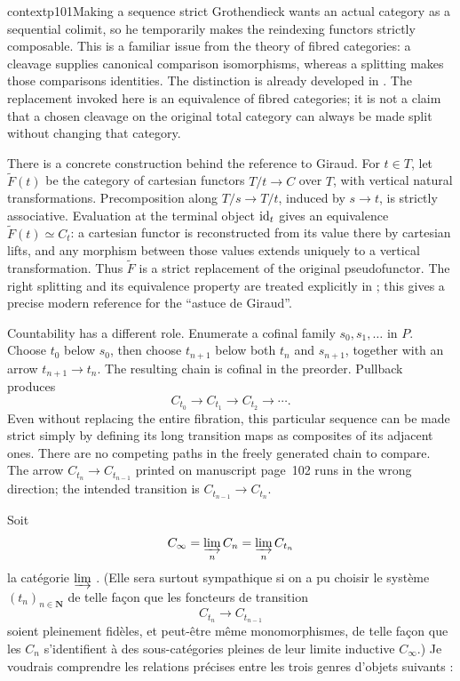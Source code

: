 \begin{dcomment}{context}{p101}{Making a sequence strict}
Grothendieck wants an actual category as a sequential colimit, so he temporarily makes the reindexing functors strictly composable. This is a familiar issue from the theory of fibred categories: a cleavage supplies canonical comparison isomorphisms, whereas a splitting makes those comparisons identities. The distinction is already developed in \citet[Expos\'e~VI, \S\S8--9]{SGA1}. The replacement invoked here is an equivalence of fibred categories; it is not a claim that a chosen cleavage on the original total category can always be made split without changing that category.

There is a concrete construction behind the reference to Giraud. For $t\in T$, let $\widetilde F(t)$ be the category of cartesian functors $T/t\to C$ over $T$, with vertical natural transformations. Precomposition along $T/s\to T/t$, induced by $s\to t$, is strictly associative. Evaluation at the terminal object $\mathrm{id}_t$ gives an equivalence $\widetilde F(t)\simeq C_t$: a cartesian functor is reconstructed from its value there by cartesian lifts, and any morphism between those values extends uniquely to a vertical transformation. Thus $\widetilde F$ is a strict replacement of the original pseudofunctor. The right splitting and its equivalence property are treated explicitly in \citet[Theorem~5.4 and Remark~5.5]{EmmeneggerMesitiRosoliniStreicher2024}; this gives a precise modern reference for the ``astuce de Giraud''.

Countability has a different role. Enumerate a cofinal family $s_0,s_1,\ldots$ in $P$. Choose $t_0$ below $s_0$, then choose $t_{n+1}$ below both $t_n$ and $s_{n+1}$, together with an arrow $t_{n+1}\to t_n$. The resulting chain is cofinal in the preorder. Pullback produces
\[
 C_{t_0}\longrightarrow C_{t_1}\longrightarrow C_{t_2}\longrightarrow\cdots.
\]
Even without replacing the entire fibration, this particular sequence can be made strict simply by defining its long transition maps as composites of its adjacent ones. There are no competing paths in the freely generated chain to compare. The arrow $C_{t_n}\to C_{t_{n-1}}$ printed on manuscript page~102 runs in the wrong direction; the intended transition is $C_{t_{n-1}}\to C_{t_n}$.
\end{dcomment}


Soit
\[
C_{\infty} = \varinjlim_{n} C_{n} = \varinjlim_{n} C_{t_{n}}
\]
la catégorie $\varinjlim$ . (Elle sera surtout sympathique si on a pu choisir le système $(t_{n})_{n\in\mathbf{N}}$ de telle façon que les foncteurs de transition
\[
C_{t_{n}} \longrightarrow C_{t_{n-1}}
\]
soient pleinement fidèles, et peut-être même monomorphismes, de telle façon que les $C_{n}$ s'identifient à des sous-catégories pleines de leur limite inductive $C_{\infty}$.) Je voudrais comprendre les relations précises entre les trois genres d'objets suivants :

